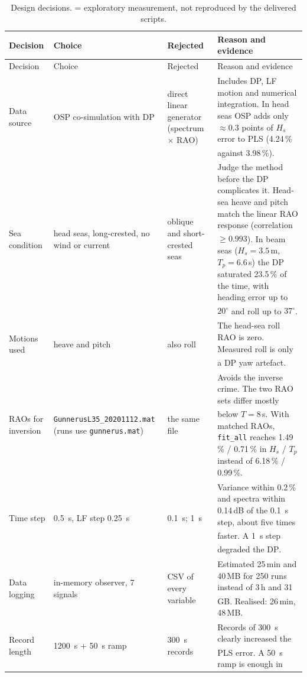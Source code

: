 \documentclass[11pt,a4paper]{article}
\newcommand{\Hs}{H_{s}}
\newcommand{\Tp}{T_{p}}
\newcommand{\pct}[1]{#1\,\%}
\newcommand{\dagnote}{\textsuperscript{\dag}}
\begin{document}
{\small
\setlength{\tabcolsep}{4pt}
\begin{longtable}{@{}>{\raggedright\arraybackslash}p{2.5cm}>{\raggedright\arraybackslash}p{3.4cm}>{\raggedright\arraybackslash}p{2.6cm}>{\raggedright\arraybackslash}p{6.4cm}@{}}
  \caption{Design decisions. \dagnote{} = exploratory measurement, not reproduced by the delivered scripts.}
  \label{tab:decisions}\\
  \toprule
  Decision & Choice & Rejected & Reason and evidence \\
  \midrule
  \endfirsthead
  \toprule
  Decision & Choice & Rejected & Reason and evidence \\
  \midrule
  \endhead
  \bottomrule
  \endfoot
  Data source & OSP co-simulation with DP & direct linear generator (spectrum $\times$ RAO) &
    Includes DP, LF motion and numerical integration. In head seas OSP adds only
    $\approx 0.3$ points of $\Hs$ error to PLS (\pct{4.24} against \pct{3.98}\dagnote). \\
  Sea condition & head seas, long-crested, no wind or current & oblique and short-crested seas &
    Judge the method before the DP complicates it. Head-sea heave and pitch match the linear RAO
    response (correlation $\ge 0.993$\dagnote). In beam seas ($\Hs = 3.5$\,m, $\Tp = 6.6$\,s) the
    DP saturated \pct{23.5} of the time, with heading error up to $20^\circ$ and roll up to
    $37^\circ$\dagnote. \\
  Motions used & heave and pitch & also roll &
    The head-sea roll RAO is zero. Measured roll is only a DP yaw artefact\dagnote. \\
  RAOs for inversion & \texttt{GunnerusL35\_20201112.mat} (runs use \texttt{gunnerus.mat}) &
    the same file & Avoids the inverse crime. The two RAO sets differ mostly below
    $T = 8$\,s\dagnote. With matched RAOs, \texttt{fit\_all} reaches \pct{1.49} / \pct{0.71} in
    $\Hs$ / $\Tp$ instead of \pct{6.18} / \pct{0.99}. \\
  Time step & \SI{0.5}{s}, LF step \SI{0.25}{s} & \SI{0.1}{s}; \SI{1}{s} &
    Variance within \pct{0.2} and spectra within 0.14\,dB of the \SI{0.1}{s} step, about five
    times faster\dagnote. A \SI{1}{s} step degraded the DP\dagnote. \\
  Data logging & in-memory observer, 7 signals & CSV of every variable &
    Estimated 25\,min and 40\,MB for 250 runs instead of 3\,h and 31\,GB\dagnote. Realised:
    26\,min, 48\,MB. \\
  Record length & \SI{1200}{s} + \SI{50}{s} ramp & \SI{300}{s} records &
    Records of \SI{300}{s} clearly increased the PLS error\dagnote. A \SI{50}{s} ramp is enough in

\end{longtable}}
\end{document}
